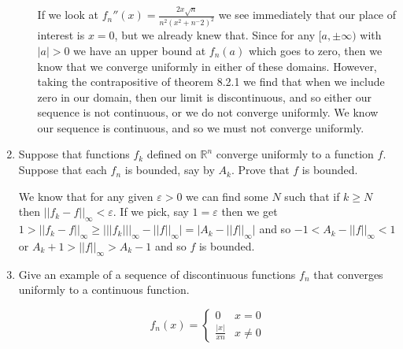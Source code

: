 \documentclass[letterpaper]{article}
\begin{document}
\begin{enumerate}
\begin{enumerate}
  If we look at $f_n''(x)=\frac{2x\sqrt{n}}{n^2(x^2+n^-2)^2}$ we see immediately that our place of interest is $x=0$, but we already knew that. Since for any $[a,\pm\infty)$ with $|a|>0$ we have an upper bound at $f_n(a)$ which goes to zero, then we know that we converge uniformly in either of these domains. However, taking the contrapositive of theorem 8.2.1 we find that when we include zero in our domain, then our limit is discontinuous, and so either our sequence is not continuous, or we do not converge uniformly. We know our sequence is continuous, and so we must not converge uniformly.
  \end{enumerate}
\item
Suppose that functions $f_k$ defined on $\mathbb{R}^n$ converge uniformly to a function $f$. Suppose that each $f_n$ is bounded, say by $A_k$. Prove that $f$ is bounded.

We know that for any given $\varepsilon>0$ we can find some $N$ such that if $k\ge N$ then $||f_k-f||_\infty<\varepsilon$. If we pick, say $1=\varepsilon$ then we get $1>||f_k-f||_\infty\ge |||f_k|||_\infty-||f||_\infty|=|A_k-||f||_\infty|$ and so $-1<A_k-||f||_\infty<1$ or $A_k+1>||f||_\infty>A_k-1$ and so $f$ is bounded.
\setcounter{enumi}{8}
\item
Give an example of a sequence of discontinuous functions $f_n$ that converges uniformly to a continuous function.

\[f_n(x)=\begin{cases}0&x=0\\\frac{|x|}{xn}&x\ne 0\end{cases}\]

\end{enumerate}
\end{document}
